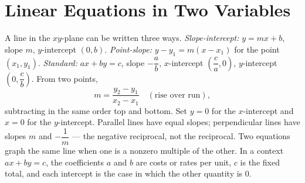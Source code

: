 \chapter{Linear Equations in Two Variables}

\begin{essentials}
A line in the $xy$-plane can be written three ways.
\emph{Slope-intercept:} $y=mx+b$, slope $m$, $y$-intercept $(0,b)$.
\emph{Point-slope:} $y-y_1=m(x-x_1)$ for the point $(x_1,y_1)$.
\emph{Standard:} $ax+by=c$, slope $-\dfrac{a}{b}$, $x$-intercept
$\left(\dfrac{c}{a},0\right)$, $y$-intercept $\left(0,\dfrac{c}{b}\right)$.
From two points,
\[ m=\frac{y_2-y_1}{x_2-x_1}\quad(\text{rise over run}), \]
subtracting in the same order top and bottom. Set $y=0$ for the
$x$-intercept and $x=0$ for the $y$-intercept. Parallel lines have equal
slopes; perpendicular lines have slopes $m$ and $-\dfrac{1}{m}$ --- the
negative reciprocal, not the reciprocal. Two equations graph the same line
when one is a nonzero multiple of the other. In a context $ax+by=c$, the
coefficients $a$ and $b$ are costs or rates per unit, $c$ is the fixed
total, and each intercept is the case in which the other quantity is $0$.
\end{essentials}

